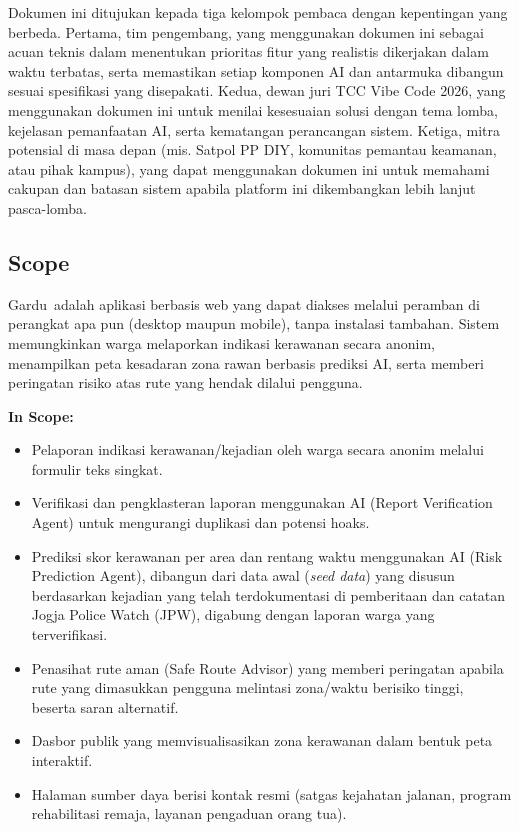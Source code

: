 \documentclass[11pt,a4paper]{article}
\newcommand{\appname}{Gardu}
\begin{document}
\noindent Dokumen ini ditujukan kepada tiga kelompok pembaca dengan kepentingan yang berbeda. Pertama, tim pengembang, yang menggunakan dokumen ini sebagai acuan teknis dalam menentukan prioritas fitur yang realistis dikerjakan dalam waktu terbatas, serta memastikan setiap komponen AI dan antarmuka dibangun sesuai spesifikasi yang disepakati. Kedua, dewan juri TCC Vibe Code 2026, yang menggunakan dokumen ini untuk menilai kesesuaian solusi dengan tema lomba, kejelasan pemanfaatan AI, serta kematangan perancangan sistem. Ketiga, mitra potensial di masa depan (mis. Satpol PP DIY, komunitas pemantau keamanan, atau pihak kampus), yang dapat menggunakan dokumen ini untuk memahami cakupan dan batasan sistem apabila platform ini dikembangkan lebih lanjut pasca-lomba.

\subsection{Scope}

\appname\ adalah aplikasi berbasis web yang dapat diakses melalui peramban di perangkat apa pun (desktop maupun mobile), tanpa instalasi tambahan. Sistem memungkinkan warga melaporkan indikasi kerawanan secara anonim, menampilkan peta kesadaran zona rawan berbasis prediksi AI, serta memberi peringatan risiko atas rute yang hendak dilalui pengguna.

\noindent
\textbf{In Scope:}
\begin{itemize}
  \item Pelaporan indikasi kerawanan/kejadian oleh warga secara anonim melalui formulir teks singkat.
  \item Verifikasi dan pengklasteran laporan menggunakan AI (Report Verification Agent) untuk mengurangi duplikasi dan potensi hoaks.
  \item Prediksi skor kerawanan per area dan rentang waktu menggunakan AI (Risk Prediction Agent), dibangun dari data awal (\textit{seed data}) yang disusun berdasarkan kejadian yang telah terdokumentasi di pemberitaan dan catatan Jogja Police Watch (JPW), digabung dengan laporan warga yang terverifikasi.
  \item Penasihat rute aman (Safe Route Advisor) yang memberi peringatan apabila rute yang dimasukkan pengguna melintasi zona/waktu berisiko tinggi, beserta saran alternatif.
  \item Dasbor publik yang memvisualisasikan zona kerawanan dalam bentuk peta interaktif.
  \item Halaman sumber daya berisi kontak resmi (satgas kejahatan jalanan, program rehabilitasi remaja, layanan pengaduan orang tua).
\end{itemize}
\end{document}
